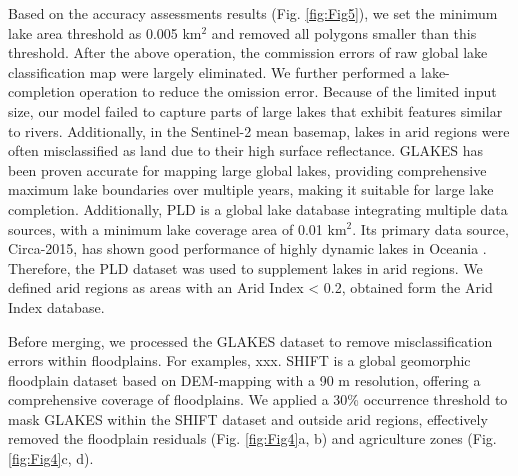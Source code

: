 \documentclass[preprint,12pt,authoryear]{elsarticle}
\begin{document}
Based on the accuracy assessments results (Fig. \ref{fig:Fig5}), we set the minimum lake area threshold as 0.005 km$^2$ and removed all polygons smaller than this threshold. After the above operation, the commission errors of raw global lake classification map were largely eliminated. We further performed a lake-completion operation to reduce the omission error. Because of the limited input size, our model failed to capture parts of large lakes that exhibit features similar to rivers. Additionally, in the Sentinel-2 mean basemap, lakes in arid regions were often misclassified as land due to their high surface reflectance. GLAKES has been proven accurate for mapping large global lakes, providing comprehensive maximum lake boundaries over multiple years, making it suitable for large lake completion. Additionally, PLD \citep{wang_global_2022} is a global lake database integrating multiple data sources, with a minimum lake coverage area of 0.01 km$^2$. Its primary data source, Circa-2015, has shown good performance of highly dynamic lakes in Oceania \citep{sheng_representative_2016}. Therefore, the PLD dataset was used to supplement lakes in arid regions. We defined arid regions as areas with an Arid Index < 0.2, obtained form the Arid Index database\citep{zomer_version_2022}.

Before merging, we processed the GLAKES dataset to remove misclassification errors within floodplains. For examples, xxx.  SHIFT \citep{zheng_shift_2024} is a global geomorphic floodplain dataset based on DEM-mapping with a 90 m resolution, offering a comprehensive coverage of floodplains. We applied a 30\% occurrence threshold to mask GLAKES within the SHIFT dataset and outside arid regions, effectively removed the floodplain residuals (Fig. \ref{fig:Fig4}a, b) and agriculture zones (Fig. \ref{fig:Fig4}c, d). 
\end{document}
